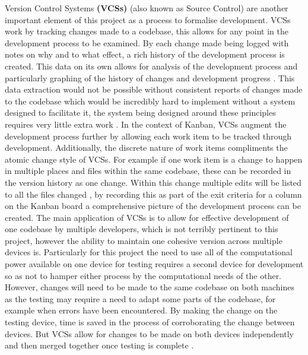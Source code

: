 \documentclass[hidelinks,journal]{IEEEtran}
\begin{document}
Version Control Systems \textbf{(VCSs)} (also known as Source Control) are another important element of this project as a process to formalise development. VCSs work by tracking changes made to a codebase, this allows for any point in the development process to be examined. By each change made being logged with notes on why and to what effect, a rich history of the development process is created. This data on its own allows for analysis of the development process and particularly graphing of the history of changes and development progress \parencite{Ball97}. This data extraction would not be possible without consistent reports of changes made to the codebase which would be incredibly hard to implement without a system designed to facilitate it, the system being designed around these principles requires very little extra work \parencite{Spinellis05}. In the context of Kanban, VCSs augment the development process further by allowing each work item to be tracked through development. Additionally, the discrete nature of work items compliments the atomic change style of VCSs. For example if one work item is a change to happen in multiple places and files within the same codebase, these can be recorded in the version history as one change. Within this change multiple edits will be listed to all the files changed \parencite{Spinellis05}, by recording this as part of the exit criteria for a column on the Kanban board a comprehensive picture of the development process can be created. The main application of VCSs is to allow for effective development of one codebase by multiple developers, which is not terribly pertinent to this project, however the ability to maintain one cohesive version across multiple devices is. Particularly for this project the need to use all of the computational power available on one device for testing requires a second device for development so as not to hamper either process by the computational needs of the other. However, changes will need to be made to the same codebase on both machines as the testing may require a need to adapt some parts of the codebase, for example when errors have been encountered. By making the change on the testing device, time is saved in the process of corroborating the change between devices. But VCSs allow for changes to be made on both devices independently and then merged together once testing is complete \parencite{De-Alwis09}.
\end{document}
